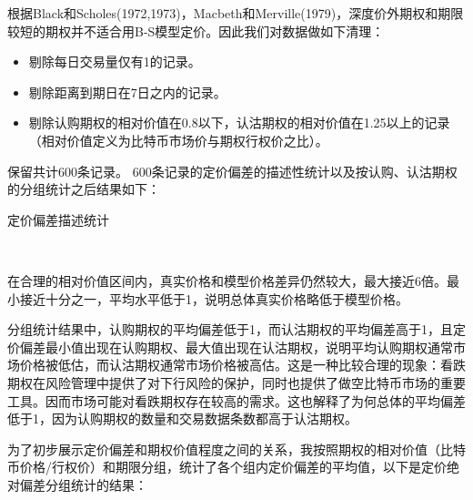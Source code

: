 根据Black和Scholes(1972,1973)\cite{J-1972}\cite{10.2307/1831029}，Macbeth和Merville(1979)\cite{Jame-1979}，深度价外期权和期限较短的期权并不适合用B-S模型定价。因此我们对数据做如下清理：
\begin{itemize}
    \item 剔除每日交易量仅有1的记录。
    \item 剔除距离到期日在7日之内的记录。
    \item 剔除认购期权的相对价值在0.8以下，认沽期权的相对价值在1.25以上的记录（相对价值定义为比特币市场价与期权行权价之比）。
    
\end{itemize}
\par{保留共计600条记录。
600条记录的定价偏差的描述性统计以及按认购、认沽期权的分组统计之后结果如下：}
~\\
\begin{center}
    \begin{threeparttable}[H]
    
        \begin{small}
            \caption{定价偏差描述统计}
            \label{tab:option_bias_group}
                
                
        \end{small} 
    \end{threeparttable}
\end{center}
~\\
\par{在合理的相对价值区间内，真实价格和模型价格差异仍然较大，最大接近6倍。最小接近十分之一，平均水平低于1，说明总体真实价格略低于模型价格。}
\par{分组统计结果中，认购期权的平均偏差低于1，而认沽期权的平均偏差高于1，且定价偏差最小值出现在认购期权、最大值出现在认沽期权，说明平均认购期权通常市场价格被低估，而认沽期权通常市场价格被高估。这是一种比较合理的现象：看跌期权在风险管理中提供了对下行风险的保护，同时也提供了做空比特币市场的重要工具。因而市场可能对看跌期权存在较高的需求。这也解释了为何总体的平均偏差低于1，因为认购期权的数量和交易数据条数都高于认沽期权。}
~\\
\par{为了初步展示定价偏差和期权价值程度之间的关系，我按照期权的相对价值（比特币价格/行权价）和期限分组，统计了各个组内定价偏差的平均值，以下是定价绝对偏差分组统计的结果：}
~\\
